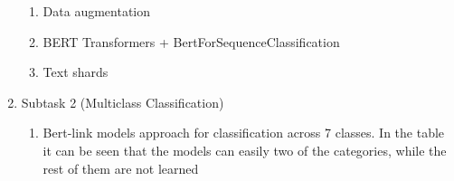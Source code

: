 \documentclass[11pt]{article}
\begin{document}
\begin{enumerate}
\begin{enumerate}
		      \item Data augmentation


		      \item BERT Transformers + BertForSequenceClassification

		     
		      \item Text shards

	      \end{enumerate}

	\item Subtask 2 (Multiclass Classification)

	      \begin{enumerate}
		      \item Bert-link models approach for classification across 7 classes. In the table it
                      can be seen that the models can easily two of the categories,
                      while the rest of them are not learned


\end{enumerate}
\end{enumerate}
\end{document}
